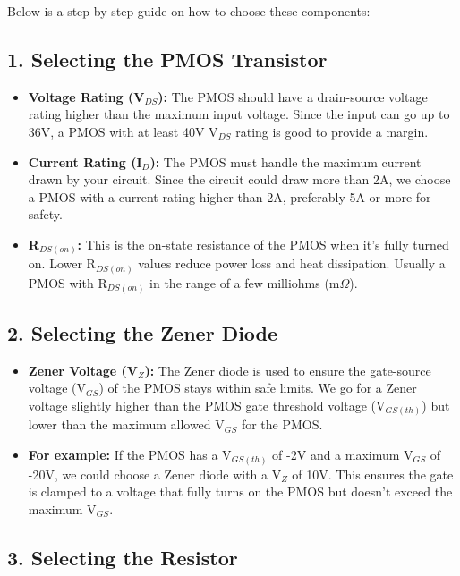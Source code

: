 \documentclass{article}
\begin{document}
Below is a step-by-step guide on how to choose these components:

\subsection*{1. Selecting the PMOS Transistor}

\begin{itemize}
    \item \textbf{Voltage Rating (V\(_{DS}\)):} The PMOS should have a drain-source voltage rating higher than the maximum input voltage. Since the input can go up to 36V, a PMOS with at least 40V V\(_{DS}\) rating is good to provide a margin.
    
    \item \textbf{Current Rating (I\(_{D}\)):} The PMOS must handle the maximum current drawn by your circuit. Since the circuit could draw more than 2A, we choose a PMOS with a current rating higher than 2A, preferably 5A or more for safety.
    
    \item \textbf{R\(_{DS(on)}\):} This is the on-state resistance of the PMOS when it's fully turned on. Lower R\(_{DS(on)}\) values reduce power loss and heat dissipation. Usually a PMOS with R\(_{DS(on)}\) in the range of a few milliohms (m\(\Omega\)).
\end{itemize}

\subsection*{2. Selecting the Zener Diode}

\begin{itemize}
    \item \textbf{Zener Voltage (V\(_Z\)):} The Zener diode is used to ensure the gate-source voltage (V\(_{GS}\)) of the PMOS stays within safe limits. We go for a Zener voltage slightly higher than the PMOS gate threshold voltage (V\(_{GS(th)}\)) but lower than the maximum allowed V\(_{GS}\) for the PMOS.
    
    \item \textbf{For example:} If the PMOS has a V\(_{GS(th)}\) of -2V and a maximum V\(_{GS}\) of -20V, we could choose a Zener diode with a V\(_Z\) of 10V. This ensures the gate is clamped to a voltage that fully turns on the PMOS but doesn’t exceed the maximum V\(_{GS}\).
\end{itemize}

\subsection*{3. Selecting the Resistor}
\end{document}

